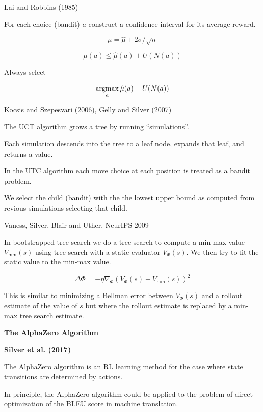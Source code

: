 {
{Lai and Robbins (1985)}

For each choice (bandit) $a$ construct a confidence interval for its average reward.

\vfill
$$\mu = \hat{\mu} \pm 2\sigma/\sqrt{n}$$

\vfill
$$\mu(a) \leq \hat{\mu}(a) + U(N(a))$$

\vfill
Always select

$$\operatorname*{argmax}_a \hat{\mu}(a) + U(N(a))$$

{Kocsis and Szepesvari (2006), Gelly and Silver (2007)}

The UCT algorithm grows a tree by running ``simulations''.

\vfill
Each simulation descends into the tree to a leaf node, expands that leaf, and returns a value.

\vfill
In the UTC algorithm each move choice at each position is treated as a bandit problem.

\vfill
We select the child (bandit) with the the lowest upper bound as computed from revious simulations selecting that child.


{Vaness, Silver, Blair and Uther, NeurIPS 2009}

In bootstrapped tree search we do a tree search to compute a min-max value $V_{\mathrm{mm}}(s)$
using tree search with a static evaluator $V_\Phi(s)$.  We then try to fit the static value to the min-max value.

\vfill
$$\Delta \Phi = - \eta \nabla_\Phi \left(V_\Phi(s) - V_{\mathrm{mm}}(s)\right)^2$$

\vfill
This is similar to minimizing a Bellman error between $V_\Phi(s)$ and a rollout estimate of the value of $s$ but where the rollout
estimate is replaced by a min-max tree search estimate.

\slide{}

\centerline{\bf The AlphaZero Algorithm}
\bigskip
\centerline{\bf Silver et al. (2017)}

\vfill


The AlphaZero algorithm is an RL learning method for the case where state transitions are determined by actions.

\vfill
In principle, the AlphaZero algorithm could be applied to the problem of direct optimization of the BLEU score in machine translation.

}
